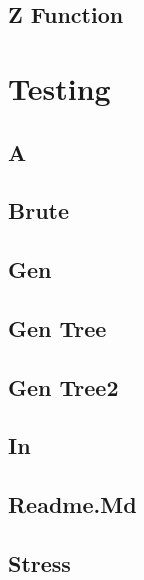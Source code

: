 \documentclass[10pt,landscape,twocolumn,a4paper,notitlepage]{article}
\newcommand\cppfile[2][]{

}
\newcommand\pythonfile[2][]{

}
\begin{document}
\subsection{Z Function}
\cppfile{strings/z_function.cpp}

\newpage


\section{Testing}

\subsection{A}
\cppfile{testing/a.cpp}

\subsection{Brute}
\cppfile{testing/brute.cpp}

\subsection{Gen}
\cppfile{testing/gen.cpp}

\subsection{Gen Tree}
\cppfile{testing/gen_tree.cpp}

\subsection{Gen Tree2}
\cppfile{testing/gen_tree2.cpp}

\subsection{In}
\pythonfile{testing/in}

\subsection{Readme.Md}
\pythonfile{testing/README.md}

\subsection{Stress}
\pythonfile{testing/stress.sh}

\newpage
\end{document}
